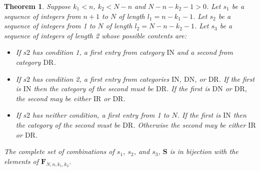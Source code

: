 \documentclass{article}
\newtheorem{theorem}{Theorem}[section]
\newcommand{\fn}{\mathbf{F}_{N,n,k_1,k_2}}
\begin{document}
\begin{theorem}\label{theorem}
Suppose $k_1 < n$, $k_2 < N-n$ and $N-n-k_2-1>0$. Let $s_1$ be a sequence of integers from $n+1$ to $N$ of length $l_1=n-k_1-1$. Let $s_2$ be a sequence of integers from 1 to $N$ of length $l_2 = N-n-k_2-1$. Let $s_3$ be a sequence of integers of length 2 whose possible contents are:
\begin{itemize}
    \item If $s2$ has condition 1, a first entry from category $\mathrm{IN}$ and a second from category $\mathrm{DR}$.
    \item If $s2$ has condition 2, a first entry from categories $\mathrm{IN}$, $\mathrm{DN}$, or $\mathrm{DR}$. If the first is $\mathrm{IN}$ then the category of the second must be $\mathrm{DR}$. If the first is $\mathrm{DN}$ or $\mathrm{DR}$, the second may be either $\mathrm{IR}$ or $\mathrm{DR}$.
    \item If $s2$ has neither condition, a first entry from 1 to $N$. If the first is $\mathrm{IN}$ then the category of the second must be $\mathrm{DR}$. Otherwise the second may be either $\mathrm{IR}$ or $\mathrm{DR}$.
\end{itemize}
The complete set of combinations of $s_1$, $s_2$, and $s_3$, $\mathbf{S}$ is in bijection with the elements of $\fn$. 
\end{theorem}
\end{document}
